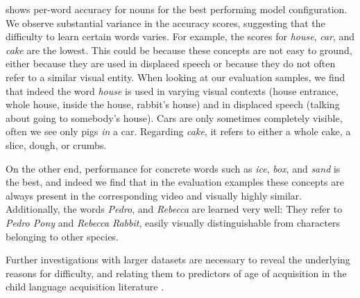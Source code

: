  shows per-word
accuracy for nouns for the best performing model configuration.
We observe substantial variance in the accuracy scores, suggesting that the 
difficulty to learn certain words varies. For example, the 
scores for \textit{house}, \textit{car}, and \textit{cake} are the lowest. This could be 
because these concepts are not easy to ground, either because they are used in 
displaced speech or because they do not often refer to a similar visual entity. 
When looking at our evaluation samples, we find that indeed the word \textit{house} 
is used in varying visual contexts (house entrance, whole house, inside the
house, rabbit's house) and in displaced speech (talking about going 
to somebody's house). Cars are only sometimes completely visible, often we see 
only pigs \textit{in} a car. Regarding \textit{cake}, it refers to either a 
whole cake, a slice, dough, or crumbs.

On the other end, performance for concrete words such as \textit{ice}, 
\textit{box}, 
and \textit{sand} is the best, and indeed we find that in the evaluation examples 
these concepts are always present in the corresponding video and visually 
highly similar. Additionally, the words \textit{Pedro}, and \textit{Rebecca} 
are learned very well: They refer to \textit{Pedro Pony} and \textit{Rebecca Rabbit}, 
easily visually distinguishable from characters belonging to other species.

Further investigations with larger datasets are necessary to reveal the 
underlying reasons for difficulty, and relating them to predictors of age of 
acquisition in the child language acquisition literature 
\cite{roy2015predicting,frank2021variability}. 


